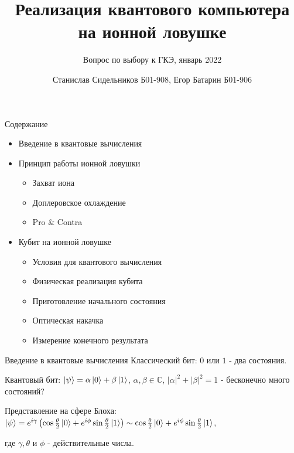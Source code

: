 \documentclass{beamer}
\title{Реализация квантового компьютера на ионной ловушке}
\subtitle{Вопрос по выбору к ГКЭ, январь 2022}
\author{Станислав Сидельников Б01-908, Егор Батарин Б01-906}
\institute{Московский физико-технический институт}
\date{}
\begin{document}
    
    \begin{frame}
        \titlepage
    \end{frame}

    \begin{frame}{Содержание}

        \begin{itemize}

            \item<1-> Введение в квантовые вычисления

      

            \item<2-> Принцип работы ионной ловушки

                \begin{itemize}
                    \item{Захват иона}
                    \item{Доплеровское охлаждение}
                    \item{Pro \& Contra}
                \end{itemize}

            \item<3-> Кубит на ионной ловушке

                \begin{itemize}

                    \item{Условия для квантового вычисления}
                    \item{Физическая реализация кубита}
                    \item{Приготовление начального состояния}
                    \item{Оптическая накачка}
                    \item{Измерение конечного результата}

                \end{itemize}
            
            \end{itemize}

                
        \end{frame}

	\begin{frame}{Введение в квантовые вычисления}
	Классический бит: $0$ или $1$ - два состояния.
	\vspace{3mm}
	
	Квантовый бит: $\ket{\psi} = \alpha\ket{0} + \beta\ket{1}$, $\alpha,\beta \in \mathbb{C}$, $|\alpha|^2 + |\beta|^2 = 1$ - бесконечно много состояний?
	\vspace{3mm}
	
	Представление на сфере Блоха: $\ket{\psi} = e^{i\gamma}\left(  \cos{\frac{\theta}{2}}\ket{0}+e^{i\phi}\sin{\frac{\theta}{2}} \ket{1}  \right) \sim \cos{\frac{\theta}{2}}\ket{0}+e^{i\phi}\sin{\frac{\theta}{2}} \ket{1} $,
	
	где $\gamma, \theta$ и $\phi$ - действительные числа.
	\end{frame}
    
\end{document}
